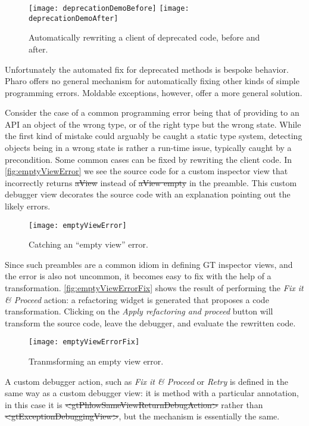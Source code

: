\documentclass[sigplan,anonymous,review,10pt]{acmart}
\begin{document}
\begin{figure}[h]
  \texttt{[image: deprecationDemoBefore]}
  \texttt{[image: deprecationDemoAfter]}
  \caption{Automatically rewriting a client of deprecated code, before and after.}
  \label{fig:deprecationDemo}
\end{figure}

Unfortunately the automated fix for deprecated methods is bespoke behavior.
Pharo offers no general mechanism for automatically fixing other kinds of simple programming errors.
Moldable exceptions, however, offer a more general solution.

Consider the case of a common programming error being that of providing to an API an object of the wrong type, or of the right type but the wrong state.
While the first kind of mistake could arguably be caught a static type system, detecting objects being in a wrong state is rather a run-time issue, typically caught by a precondition.
Some common cases can be fixed by rewriting the client code.
In \autoref{fig:emptyViewError} we see the source code for a custom inspector view that incorrectly returns \st{aView} instead of \st{aView empty} in the preamble.
This custom debugger view decorates the source code with an explanation pointing out the likely errors.

\begin{figure}[h]
  \texttt{[image: emptyViewError]}
  \caption{Catching an ``empty view'' error.}
  \label{fig:emptyViewError}
\end{figure}

Since such preambles are a common idiom in defining GT inspector views, and the error is also not uncommon, it becomes easy to fix with the help of a transformation.
\autoref{fig:emptyViewErrorFix} shows the result of performing the \emph{Fix it \& Proceed} action: a refactoring widget is generated that proposes a code transformation.
Clicking on the \emph{Apply refactoring and proceed} button will transform the source code, leave the debugger, and evaluate the rewritten code.

\begin{figure}[h]
  \texttt{[image: emptyViewErrorFix]}
  \caption{Tranmsforming an empty view error.}
  \label{fig:emptyViewErrorFix}
\end{figure}

A custom debugger action, such as \emph{Fix it \& Proceed} or \emph{Retry} is defined in the same way as a custom debugger view: it is method with a particular annotation, in this case it is \st{<gtPhlowSameViewReturnDebugAction>} rather than \mbox{\st{<gtExceptionDebuggingView>}}, but  the mechanism is essentially the same.
\end{document}
